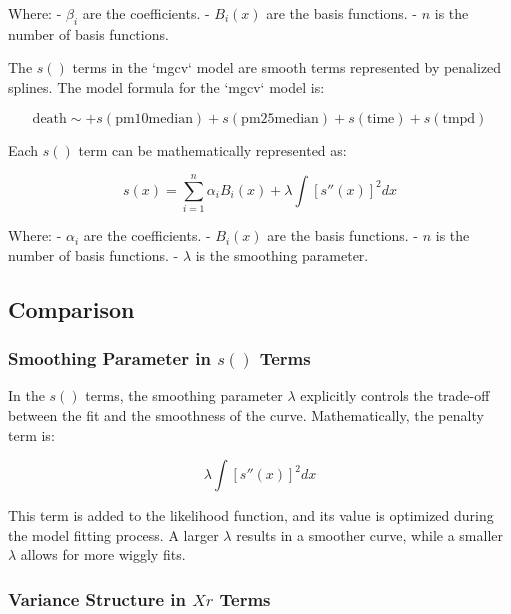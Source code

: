 Where:
- \( \beta_i \) are the coefficients.
- \( B_i(x) \) are the basis functions.
- \( n \) is the number of basis functions.
\newline

The \(s()\) terms in the `mgcv` model are smooth terms represented by penalized splines. The model formula for the `mgcv` model is:

\begin{equation}
\text{death} \sim + s(\text{pm10median}) + s(\text{pm25median}) + s(\text{time}) + s(\text{tmpd})
\end{equation}



Each \(s()\) term can be mathematically represented as:

\begin{equation}
s(x) = \sum_{i=1}^{n} \alpha_i B_i(x) + \lambda \int [s''(x)]^2 dx
\end{equation}

Where:
- \( \alpha_i \) are the coefficients.
- \( B_i(x) \) are the basis functions.
- \( n \) is the number of basis functions.
- \( \lambda \) is the smoothing parameter.

\subsection{Comparison}

\subsubsection{Smoothing Parameter in $s()$ Terms}

In the \(s()\) terms, the smoothing parameter \(\lambda\) explicitly controls the trade-off between the fit and the smoothness of the curve. Mathematically, the penalty term is:

\begin{equation}
\lambda \int [s''(x)]^2 dx
\end{equation}

This term is added to the likelihood function, and its value is optimized during the model fitting process. A larger \(\lambda\) results in a smoother curve, while a smaller \(\lambda\) allows for more wiggly fits.

\subsubsection{Variance Structure in \(Xr\) Terms}

